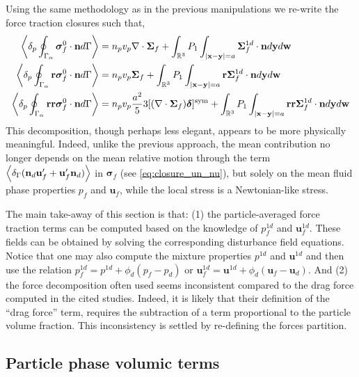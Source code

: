 Using the same methodology as in the previous manipulations we re-write the force traction closures such that, 
\begin{align}
    \pSavg{\bm\sigma_f^0\cdot\textbf{n}}
    &=
    n_p v_p 
    \div\bm\Sigma_f
    +
    \int_{\mathbb{R}^3}
    P_1
    \int_{|\textbf{x}-\textbf{y}|=a}
    \bm\Sigma_f^{1d} \cdot \textbf{n}
    d\textbf{y}d\textbf{w}
    \label{eq:drag_final2}\\
    \pSavg{\textbf{r}\bm\sigma_f^0\cdot\textbf{n}}
    &=
    n_p v_p \bm\Sigma_f
    +
    \int_{\mathbb{R}^3}
    P_1
    \int_{|\textbf{x}-\textbf{y}|=a}
    \textbf{r}\bm\Sigma_f^{1d} \cdot \textbf{n}
    d\textbf{y}
    d\textbf{w}
    \\
    \pSavg{\textbf{rr}\bm\sigma_f^0\cdot\textbf{n}}
    &=
    n_pv_p  \frac{a^2}{5} 3 [(\div \bm\Sigma_f)\bm\delta]^\text{sym}
    +
    \int_{\mathbb{R}^3}
    P_1
    \int_{|\textbf{x}-\textbf{y}|=a}
    \textbf{rr}\bm\Sigma_f^{1d} \cdot \textbf{n}
    d\textbf{y}
    d\textbf{w}
    \label{eq:second_mom_general2}
\end{align}
This decomposition, though perhaps less elegant, appears to be more physically meaningful. 
Indeed, unlike the previous approach, the mean contribution no longer depends on the mean relative motion through the term $\left<\delta_\Gamma (\textbf{n}_d \textbf{u}_f'+  \textbf{u}_f' \textbf{n}_d)\right>$ in $\bm\sigma_f$ (see \ref{eq:closure_un_nu}), but solely on the mean fluid phase properties $p_f$ and $\textbf{u}_f$, while the local stress is a Newtonian-like stress.  

The main take-away of this section is that: (1)  the particle-averaged force traction terms can be computed based on the knowledge of $p_f^{1d}$ and $\textbf{u}_f^{1d}$. 
These fields can be obtained by solving the corresponding disturbance field equations. 
Notice that one may also compute the mixture properties $p^{1d}$ and $\textbf{u}^{1d}$ and then use the relation $p_f^{1d} = p^{1d} + \phi_d (p_f - p_d)$ or $\textbf{u}_f^{1d} = \textbf{u}^{1d} + \phi_d (\textbf{u}_f - \textbf{u}_d)$. 
And (2) the force decomposition often used \citep{jackson2000,zhang1997momentum,wang2021numerical,wang2024effect} seems inconsistent compared to the drag force computed in the cited studies.
Indeed, it is likely that their definition of the ``drag force'' term, requires the subtraction of a term proportional to the particle volume fraction. 
This inconsistency is settled by re-defining the forces partition.  

\subsection{Particle phase volumic terms}

